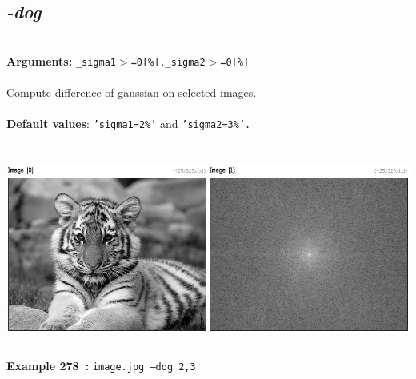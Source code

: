 \documentclass[a4paper,11pt,twoside]{book}
\begin{document}
\subsection{\emph{-dog} }\vspace*{-0.5em}
~\\\textbf{Arguments: } 
{\small \texttt{\_sigma1$>$=0[\%],\_sigma2$>$=0[\%]}}\\~\\
Compute difference of gaussian on selected images.
~\\~\\\textbf{Default values}: {\small \texttt{'sigma1=2\%'} and \texttt{'sigma2=3\%'.}}
\begin{center}\includegraphics[keepaspectratio=true,height=7cm,width=\textwidth]{img/gmic_def278.jpg}\\
{\footnotesize \textbf{Example 278~:} \texttt{image.jpg --dog 2,3}}
\end{center}
\end{document}
